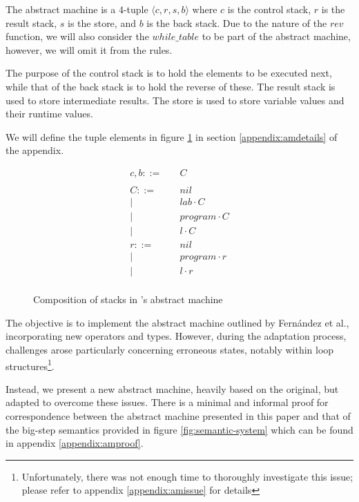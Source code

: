 The abstract machine is a $4$-tuple $\langle c, r, s, b \rangle$ where $c$ is the control stack, $r$ is the result stack, $s$ is the store, and $b$ is the back stack. Due to the nature of the $rev$ function, we will also consider the $while\_table$ to be part of the abstract machine, however, we will omit it from the rules.

The purpose of the control stack is to hold the elements to be executed next, while that of the back stack is to hold the reverse of these. The result stack is used to store intermediate results. The store is used to store variable values and their runtime values.

We will define the tuple elements in figure \ref{fig:stackdefinition} in section \ref{appendix:amdetails} of the appendix.
 

\begin{figure}[ht]
    \centering
    \begin{align*}
    c, b ::=&\quad C \\
    \\
    C ::=&\quad nil \\|&\quad lab \cdot C \\|&\quad program \cdot C \\|&\quad l \cdot C \\
    r ::=&\quad nil \\|&\quad program \cdot r \\|&\quad l \cdot r \\
    \end{align*}
    \caption{Composition of stacks in \rimp's abstract machine}
    \label{fig:stackdefinition}
\end{figure}

The objective is to implement the abstract machine outlined by Fern{\'a}ndez et al.\cite{Rimp}, incorporating new operators and types. However, during the adaptation process, challenges arose particularly concerning erroneous states, notably within loop structures\footnote{Unfortunately, there was not enough time to thoroughly investigate this issue; please refer to appendix \ref{appendix:amissue} for details\label{fn:amissue}}.

Instead, we present a new abstract machine, heavily based on the original, but adapted to overcome these issues. There is a minimal and informal proof for correspondence between the abstract machine presented in this paper and that of the big-step semantics provided in figure \ref{fig:semantic-system} which can be found in appendix \ref{appendix:amproof}.


